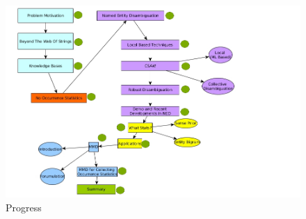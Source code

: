 \documentclass{beamer}
\begin{document}

\begin{frame}
 \begin{center}
 \begin{figure}[h]
 
 \includegraphics[bb=0 0 937 610, scale=0.35]{./mark4.jpg}
 \caption{Progress}
\end{figure}
\end{center}
\end{frame}



\end{document}
